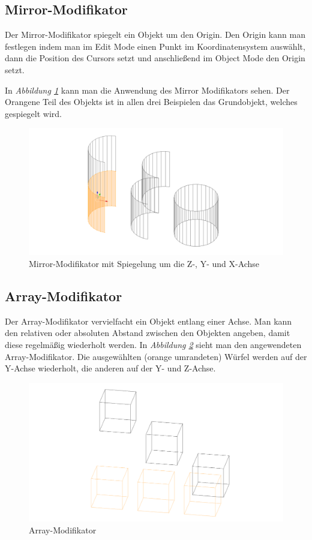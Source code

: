 \subsection{Mirror-Modifikator\citep{blender:mirror_modifier}}
\label{Mirror:heading}
Der Mirror-Modifikator spiegelt ein Objekt um den Origin.
Den Origin kann man festlegen indem man im Edit Mode einen Punkt im Koordinatensystem auswählt, dann die Position des Cursors setzt
und anschließend im Object Mode den Origin setzt.

In \textit{Abbildung \ref{modifikatoren:image2}} kann man die Anwendung des Mirror Modifikators sehen. Der Orangene Teil des Objekts ist in allen drei Beispielen das
Grundobjekt, welches gespiegelt wird.

\begin{figure}[h]
    \centering
    \includegraphics[width=.8\textwidth]{images/Modifikatoren-Mirror.png}
    \caption{Mirror-Modifikator mit Spiegelung um die Z-, Y- und X-Achse}
    \label{modifikatoren:image2}
\end{figure}

\subsection{Array-Modifikator\citep{blender:array_modifier}}
\label{Array:heading}
Der Array-Modifikator vervielfacht ein Objekt entlang einer Achse. Man kann den relativen oder absoluten Abstand zwischen den Objekten
angeben, damit diese regelmäßig wiederholt werden. In \textit{Abbildung \ref{modifikatoren:image3}} sieht man den angewendeten Array-Modifikator.
Die ausgewählten (orange umrandeten) Würfel werden auf der Y-Achse
wiederholt, die anderen auf der Y- und Z-Achse.
\begin{figure}[h]
    \centering
    \includegraphics[width=.8\textwidth]{images/Modifikatoren-Array.png}
    \caption{Array-Modifikator}
    \label{modifikatoren:image3}
\end{figure}

